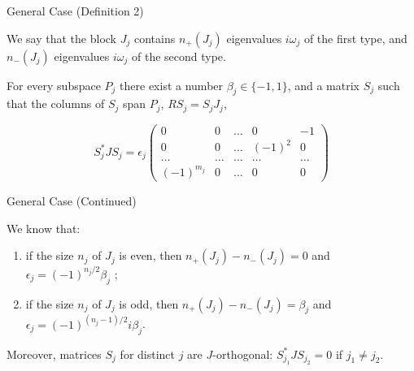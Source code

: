 
\begin{frame}{General Case (Definition 2)}


\begin{definition} We say that the block $J_{j}$ contains $n_{+}(J_{j})$ eigenvalues $i\omega_{j}$ of the first type, and $n_{-}(J_{j})$ eigenvalues $i\omega_{j}$ of the second type.
\end{definition}



For every subspace $P_{j}$ there exist a number $\beta_{j}\in\{-1,1\}$, and a matrix $S_{j}$ such that the columns of $S_{j}$ span $P_{j}$, $RS_{j}=S_{j}J_{j}$, 

$$ S_{j}^{*}JS_{j} = \epsilon_{j} \left(\begin{array}{ccccc} 0 & 0 & \ldots & 0 & -1 \\
0 & 0 & \ldots & (-1)^{2} & 0 \\  \ldots &  \ldots &  \ldots &  \ldots &  \ldots \\ (-1)^{m_{j}} & 0 & \ldots & 0 & 0 \end{array}\right)
$$




\end{frame}

\begin{frame}{General Case (Continued)}

\begin{block}{We know that:}

\begin{enumerate}


\item if the size $n_{j}$ of $J_{j}$ is even, then $n_{+}(J_{j})-n_{-}(J_{j})=0$ and $\epsilon_{j}=(-1)^{n_{j}/2}\beta_{j}$ ;

\item if the size $n_{j}$ of $J_{j}$ is odd, then $n_{+}(J_{j})-n_{-}(J_{j})=\beta_{j}$ and $\epsilon_{j}=(-1)^{(n_{j}-1)/2}i\beta_{j}$.

\end{enumerate}

\end{block}

\qquad

Moreover, matrices $S_{j}$ for distinct $j$ are $J$-orthogonal: $S_{j_{1}}^{*}JS_{j_{2}}=0$ if $j_{1}\ne j_{2}$.




\end{frame}

